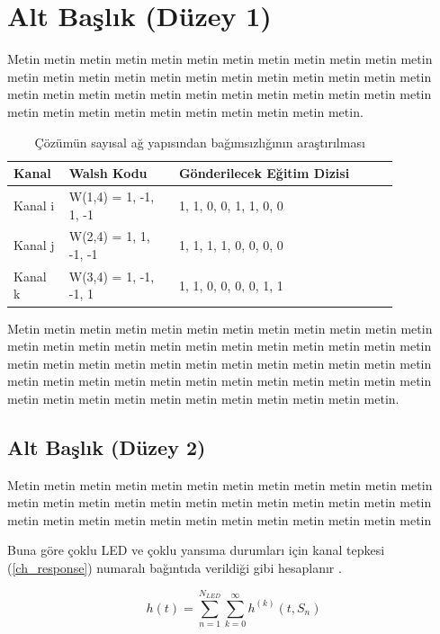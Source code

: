 \documentclass[a4paper, 12pt, oneside]{GuThesis}
\begin{document}
{\section{Alt Başlık (Düzey 1)}

Metin metin metin metin metin metin metin metin metin metin metin metin metin metin metin metin metin metin metin metin metin metin metin metin metin metin metin metin metin metin metin metin metin metin metin metin metin metin metin metin metin metin metin metin metin metin.

\begin{table}[h]
\caption{Çözümün sayısal ağ yapısından bağımsızlığının araştırılması}
\centering
\begin{tabular}{m{0.1\linewidth} m{0.25\linewidth} m{0.5\linewidth}}
 \hline
 \textbf{Kanal} & \textbf{Walsh Kodu} & \textbf{Gönderilecek Eğitim Dizisi} \\ 
 \hline
 Kanal i & W(1,4) = 1, -1, 1, -1 & 1, 1, 0, 0, 1, 1, 0, 0 \\ 
 \hline
 Kanal j & W(2,4) = 1, 1, -1, -1 & 1, 1, 1, 1, 0, 0, 0, 0 \\
 \hline
 Kanal k & W(3,4) = 1, -1, -1, 1 & 1, 1, 0, 0, 0, 0, 1, 1 \\
 \hline
\end{tabular}
\end{table}

Metin metin metin metin metin metin metin metin metin metin metin metin metin metin metin metin metin metin metin metin metin metin metin metin metin metin metin metin metin metin metin metin metin metin metin metin metin metin metin metin metin metin metin metin metin metin metin metin metin metin metin metin metin metin metin metin metin metin metin.

\subsection{Alt Başlık (Düzey 2)}

Metin metin metin metin metin metin metin metin metin metin metin metin metin metin metin metin metin metin metin metin metin metin metin metin metin metin metin metin metin metin metin metin metin metin metin metin

Buna göre çoklu LED ve çoklu yansıma durumları için kanal tepkesi (\ref{ch_response}) numaralı bağıntıda verildiği gibi hesaplanır \cite{Reference1}.

\begin{equation}\label{ch_response}
    h(t) = \sum_{n=1}^{N_{LED}}\sum_{k=0}^\infty h^{(k)}(t, S_n)
\end{equation}

}
\end{document}
